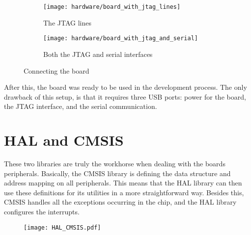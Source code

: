\begin{figure}[H]
\centering
\begin{subfigure}{.5\textwidth}
  \centering
  \texttt{[image: hardware/board\_with\_jtag\_lines]}
  \caption{The JTAG lines}
  \label{fig:sub1}
\end{subfigure}%
\begin{subfigure}{.5\textwidth}
  \centering
  \texttt{[image: hardware/board\_with\_jtag\_and\_serial]}
  \caption{Both the JTAG and serial interfaces}
  \label{fig:sub2}
\end{subfigure}
\caption{Connecting the board}
\label{fig:photo2}
\end{figure}

After this, the board was ready to be used in the development process.
The only drawback of this setup, is that it requires three USB ports:
power for the board, the JTAG interface, and the serial communication.

\section{HAL and CMSIS}
These two libraries are truly the workhorse when dealing with the 
board\textquotesingle s peripherals. Basically, the CMSIS library
is defining the data structure and address mapping on all peripherals.
This means that the HAL library can then use these definitions for its
utilities in a more straightforward way. Besides this, CMSIS handles
all the exceptions occurring in the chip, and the HAL library configures
the interrupts.
 
\begin{figure}[H]
\centering
\texttt{[image: HAL\_CMSIS.pdf]}
\end{figure}

